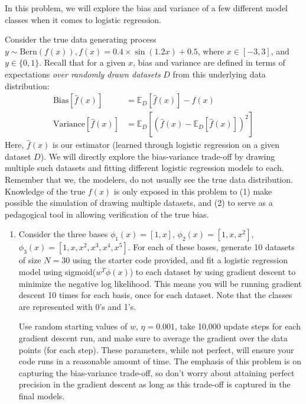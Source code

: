 \documentclass[submit]{harvardml}
\begin{document}
\begin{problem}
  In this problem, we will explore the bias and variance of a
  few different model classes when it comes to logistic regression.

  Consider the true data generating process $y \sim \text{Bern}(f(x)), f(x) = 0.4 \times \sin(1.2x) + 0.5$, where $x \in [-3, 3]$, and $y \in \{0,1\}$.
  Recall that for a given $x$, bias and variance are defined in terms of expectations \textit{over randomly drawn datasets} $D$
  from this underlying data distribution:
  \begin{align*}
  \text{Bias}[\hat{f}(x)] &= \mathbb{E}_D[\hat{f}(x)] - f(x)\\
  \text{Variance}[\hat{f}(x)] &= \mathbb{E}_D[(\hat{f}(x) - \mathbb{E}_D[\hat{f}(x)])^2]
  \end{align*}
  Here, $\hat{f}(x)$ is our estimator (learned through logistic
  regression on a given dataset $D$).  We will directly explore the
  bias-variance trade-off by drawing multiple such datasets and
  fitting different logistic regression models to each.  Remember that
  we, the modelers, do not usually see the true data distribution.
  Knowledge of the true $f(x)$ is only exposed in this problem to (1)
  make possible the simulation of drawing multiple datasets, and (2)
  to serve as a pedagogical tool in allowing verification of the true
  bias.

\begin{enumerate}

\item Consider the three bases $\phi_1(x) = [1, x]$, $\phi_2(x) = [1,
  x, x^2]$, $\phi_3(x) = [1, x, x^2, x^3, x^4, x^5]$.  For each
  of these bases, generate 10 datasets of size $N = 30$ using the
  starter code provided, and fit a logistic regression model using
  sigmoid($w^T \phi(x)$) to each dataset by using gradient descent to
  minimize the negative log likelihood.  This means you will be
  running gradient descent 10 times for each basis, once for each
  dataset.  Note that the classes are represented with 0's and 1's.
  
  Use random starting values of $w$, $\eta=0.001$, take 10,000 update
  steps for each gradient descent run, and make sure to average the
  gradient over the data points (for each step). These parameters,
  while not perfect, will ensure your code runs in a reasonable amount
  of time. The emphasis of this problem is on capturing the
  bias-variance trade-off, so don't worry about attaining perfect
  precision in the gradient descent as long as this trade-off is
  captured in the final models.


\end{enumerate}
\end{problem}
\end{document}
